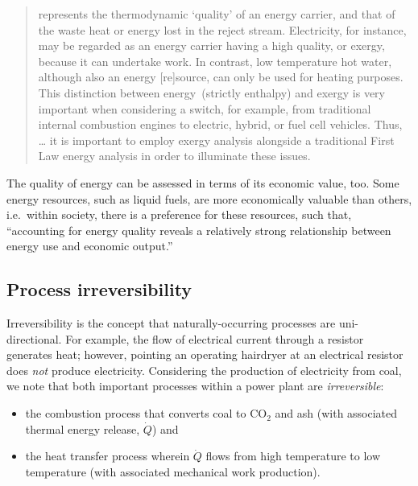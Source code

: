 \begin{quote}
	represents the thermodynamic `quality' 
	of an energy carrier, 
	and that of the waste heat or energy lost in the reject stream. 
	Electricity, for instance, 
	may be regarded as an energy carrier having a high quality, 
	or exergy, because it can undertake work. 
	In contrast, low temperature hot water, 
	although also an energy [re]source, 
	can only be used for heating purposes. 
	This distinction between energy~(strictly enthalpy) 
	and exergy is very important 
	when considering a switch, for example, 
	from traditional internal combustion engines 
	to electric, hybrid, or fuel cell vehicles. 
	Thus, \ldots{} it is important to employ exergy analysis 
	alongside a traditional First Law energy analysis 
	in order to illuminate these issues.
\end{quote}

The quality of energy can be assessed in terms of its economic value, too.
Some energy resources, such as liquid fuels, 
are more economically valuable than others,
i.e.\ within society, there is a preference for these resources,
such that, ``accounting for energy quality reveals a relatively strong relationship 
between energy use and economic output.''~\cite[p. 313]{Cleveland2000}


\subsection{Process irreversibility}
\label{sec:irreversibility}

Irreversibility is the concept that naturally-occurring processes 
are uni-directional.
For example, the flow of electrical current through a resistor
generates heat;
however, pointing an operating hairdryer at an electrical resistor 
does \emph{not} produce electricity.
Considering the production of electricity from coal,
we note that both important processes within a power plant are \emph{irreversible}:

\begin{itemize}
	\item{the combustion process that converts coal to CO$_{2}$ and ash 
	(with associated thermal energy release, $\dot{Q}$) and}
	\item{the heat transfer process wherein $\dot{Q}$ flows 
	from high temperature to low temperature (with associated mechanical work production).}
\end{itemize}

